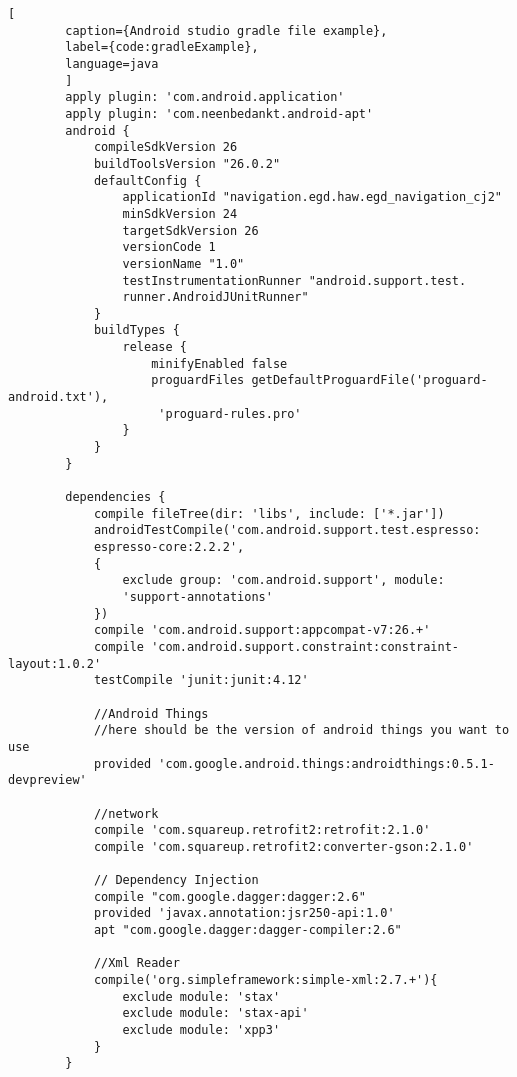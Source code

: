     \newpage    
    \begin{lstlisting}[
        caption={Android studio gradle file example},
        label={code:gradleExample},
        language=java
        ]
        apply plugin: 'com.android.application'
        apply plugin: 'com.neenbedankt.android-apt'
        android {
            compileSdkVersion 26
            buildToolsVersion "26.0.2"
            defaultConfig {
                applicationId "navigation.egd.haw.egd_navigation_cj2"
                minSdkVersion 24
                targetSdkVersion 26
                versionCode 1
                versionName "1.0"
                testInstrumentationRunner "android.support.test.
                runner.AndroidJUnitRunner"
            }
            buildTypes {
                release {
                    minifyEnabled false
                    proguardFiles getDefaultProguardFile('proguard-android.txt'),
                     'proguard-rules.pro'
                }
            }
        }
        
        dependencies {
            compile fileTree(dir: 'libs', include: ['*.jar'])
            androidTestCompile('com.android.support.test.espresso:
            espresso-core:2.2.2', 
            {
                exclude group: 'com.android.support', module: 
                'support-annotations'
            })
            compile 'com.android.support:appcompat-v7:26.+'
            compile 'com.android.support.constraint:constraint-layout:1.0.2'
            testCompile 'junit:junit:4.12'
        
            //Android Things
            //here should be the version of android things you want to use
            provided 'com.google.android.things:androidthings:0.5.1-devpreview'
        
            //network
            compile 'com.squareup.retrofit2:retrofit:2.1.0'
            compile 'com.squareup.retrofit2:converter-gson:2.1.0'
        
            // Dependency Injection
            compile "com.google.dagger:dagger:2.6"
            provided 'javax.annotation:jsr250-api:1.0'
            apt "com.google.dagger:dagger-compiler:2.6"
        
            //Xml Reader
            compile('org.simpleframework:simple-xml:2.7.+'){
                exclude module: 'stax'
                exclude module: 'stax-api'
                exclude module: 'xpp3'
            }
        }
         
    \end{lstlisting} 